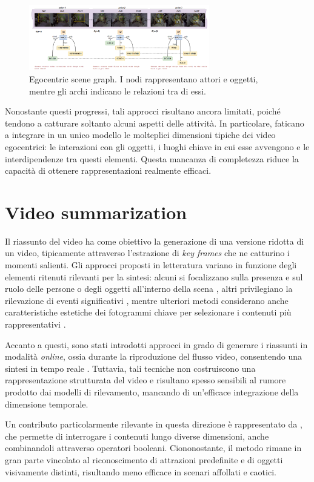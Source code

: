 \begin{figure}[H]
    \centering
    \includegraphics[width=0.7\textwidth]{Images/ego_graph.png}
    \caption{Egocentric scene graph. I nodi rappresentano attori e oggetti, mentre gli archi indicano le relazioni tra di essi.}
    \label{fig:ego_scene_graph}
\end{figure}

Nonostante questi progressi, tali approcci risultano ancora limitati, poiché tendono a catturare soltanto alcuni aspetti delle attività. In particolare, faticano a integrare in un unico modello le molteplici dimensioni tipiche dei video egocentrici: le interazioni con gli oggetti, i luoghi chiave in cui esse avvengono e le interdipendenze tra questi elementi. Questa mancanza di completezza riduce la capacità di ottenere rappresentazioni realmente efficaci.

\section{Video summarization}

Il riassunto del video ha come obiettivo la generazione di una versione ridotta di un video, tipicamente attraverso l'estrazione di \emph{key frames} che ne catturino i momenti salienti. Gli approcci proposti in letteratura variano in funzione degli elementi ritenuti rilevanti per la sintesi: alcuni si focalizzano sulla presenza e sul ruolo delle persone o degli oggetti all'interno della scena \cite{6247820}, altri privilegiano la rilevazione di eventi significativi \cite{Lu_2013_CVPR}, mentre ulteriori metodi considerano anche caratteristiche estetiche dei fotogrammi chiave per selezionare i contenuti più rappresentativi \cite{10.1007/978-3-319-10602-1_19}. 

Accanto a questi, sono stati introdotti approcci in grado di generare i riassunti in modalità \emph{online}, ossia durante la riproduzione del flusso video, consentendo una sintesi in tempo reale \cite{Lin_2015_ICCV_Workshops,Zhao_2014_CVPR}. Tuttavia, tali tecniche non costruiscono una rappresentazione strutturata del video e risultano spesso sensibili al rumore prodotto dai modelli di rilevamento, mancando di un'efficace integrazione della dimensione temporale.

Un contributo particolarmente rilevante in questa direzione è rappresentato da \cite{Xiong_2015_ICCV}, che permette di interrogare i contenuti lungo diverse dimensioni, anche combinandoli attraverso operatori booleani. Ciononostante, il metodo rimane in gran parte vincolato al riconoscimento di attrazioni predefinite e di oggetti visivamente distinti, risultando meno efficace in scenari affollati e caotici.